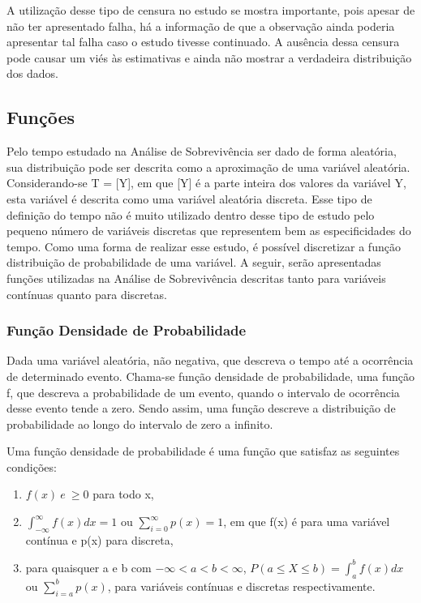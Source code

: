 \documentclass[
	article,
	12pt,				%
	openright,			%
	twoside,			%
	a4paper,			%
	english,			%
	french,				%
	spanish,			%
	brazil				%
	]{abntex2}
\begin{document}
A utilização desse tipo de censura no estudo se mostra importante, pois apesar de não ter apresentado falha, há a informação de que a observação ainda poderia apresentar tal falha caso o estudo tivesse continuado. A ausência dessa censura pode causar um viés às estimativas e ainda não mostrar a verdadeira distribuição dos dados.

\subsection{Funções}

Pelo tempo estudado na Análise de Sobrevivência ser dado de forma aleatória, sua distribuição pode ser descrita como a aproximação de uma variável aleatória. Considerando-se T = [Y], em que [Y] é a parte inteira dos valores da variável Y, esta variável é descrita como uma variável aleatória discreta. Esse tipo de definição do tempo não é muito utilizado dentro desse tipo de estudo pelo pequeno número de variáveis discretas que representem bem as especificidades do tempo. Como uma forma de realizar esse estudo, é possível discretizar a função distribuição de probabilidade de uma variável. A seguir, serão apresentadas funções utilizadas na Análise de Sobrevivência descritas tanto para variáveis contínuas quanto para discretas.

\subsubsection{Função Densidade de Probabilidade}

Dada uma variável aleatória, não negativa, que descreva o tempo até a ocorrência de determinado evento. Chama-se função densidade de probabilidade, uma função f, que descreva a probabilidade de um evento, quando o intervalo de ocorrência desse evento tende a zero. Sendo assim, uma função descreve a distribuição de probabilidade ao longo do intervalo de zero a infinito.

Uma função densidade de probabilidade é uma função que satisfaz as seguintes condições:

\begin{enumerate}
  \item $f(x) \ e \ \ge 0$ para todo x,
  \item $\int_{-\infty}^{\infty} f(x)dx = 1$ ou $\sum\limits_{i=0}^{\infty}p(x)=1$, em que f(x) é para uma variável contínua e p(x) para discreta,
  \item para quaisquer a e b com $-\infty<a<b<\infty$, $P(a \le X \le b) = \int_a^b f(x)dx $ ou $\sum\limits_{i=a}^{b}p(x)$, para variáveis contínuas e discretas respectivamente.
\end{enumerate}
\end{document}
